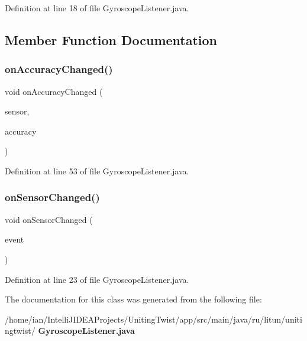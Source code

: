 Definition at line 18 of file Gyroscope\+Listener.\+java.



\subsection{Member Function Documentation}
\mbox{\label{classunitingtwist_1_1_gyroscope_listener_ad4112c2f627aebbbde6f254a743597d7}} 
\subsubsection{on\+Accuracy\+Changed()}
{\footnotesize\ttfamily void on\+Accuracy\+Changed (\begin{DoxyParamCaption}\item[{Sensor}]{sensor,  }\item[{int}]{accuracy }\end{DoxyParamCaption})}



Definition at line 53 of file Gyroscope\+Listener.\+java.

\mbox{\label{classunitingtwist_1_1_gyroscope_listener_af9fd31ff49a1d915a5c85cd04d87d30b}} 
\subsubsection{on\+Sensor\+Changed()}
{\footnotesize\ttfamily void on\+Sensor\+Changed (\begin{DoxyParamCaption}\item[{Sensor\+Event}]{event }\end{DoxyParamCaption})}



Definition at line 23 of file Gyroscope\+Listener.\+java.



The documentation for this class was generated from the following file\+:\begin{DoxyCompactItemize}
\item 
/home/ian/\+Intelli\+J\+I\+D\+E\+A\+Projects/\+Uniting\+Twist/app/src/main/java/ru/litun/unitingtwist/\textbf{ Gyroscope\+Listener.\+java}\end{DoxyCompactItemize}
